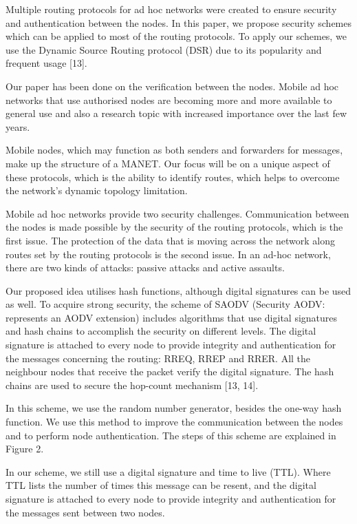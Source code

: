 \documentclass{default}
\begin{document}
Multiple routing protocols for ad hoc networks were created to ensure security and authentication between the nodes. In this paper, we propose security schemes which can be applied to most of the routing protocols. To apply our schemes, we use the Dynamic Source Routing protocol (DSR) due to its popularity and frequent usage [13].

Our paper has been done on the verification between the nodes. Mobile ad hoc networks that use authorised nodes are becoming more and more available to general use and also a research topic with increased importance over the last few years.

Mobile nodes, which may function as both senders and forwarders for messages, make up the structure of a MANET. Our focus will be on a unique aspect of these protocols, which is the ability to identify routes, which helps to overcome the network's dynamic topology limitation.

Mobile ad hoc networks provide two security challenges. Communication between the nodes is made possible by the security of the routing protocols, which is the first issue. The protection of the data that is moving across the network along routes set by the routing protocols is the second issue. In an ad-hoc network, there are two kinds of attacks: passive attacks and active assaults.

Our proposed idea utilises hash functions, although digital signatures can be used as well. To acquire strong security, the scheme of SAODV (Security AODV: represents an AODV extension) includes algorithms that use digital signatures and hash chains to accomplish the security on different levels. The digital signature is attached to every node to provide integrity and authentication for the messages concerning the routing: RREQ, RREP and RRER. All the neighbour nodes that receive the packet verify the digital signature. The hash chains are used to secure the hop-count mechanism [13, 14].

In this scheme, we use the random number generator, besides the one-way hash function. We use this method to improve the communication between the nodes and to perform node authentication. The steps of this scheme are explained in Figure 2.

In our scheme, we still use a digital signature and time to live (TTL). Where TTL lists the number of times this message can be resent, and the digital signature is attached to every node to provide integrity and authentication for the messages sent between two nodes.
\end{document}
